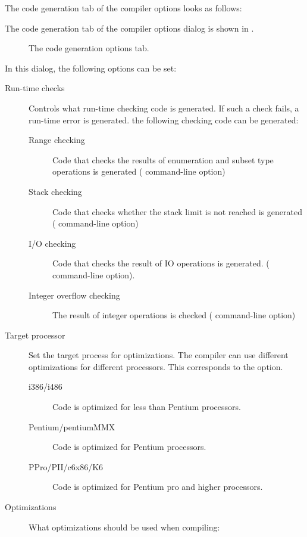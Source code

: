 \begin{htmlonly}
The code generation tab of the compiler options  looks as follows:
\end{htmlonly}
\begin{latexonly}
The code generation tab of the compiler options dialog is shown in
.
\begin{figure}[ht]
\begin{center}
\caption{The code generation options tab.}\label{fig:ocompb}
\ifpdf
{}
\else
{}
\fi
\end{center}
\end{figure}
\end{latexonly}
In this dialog, the following options can be set:
\begin{description}
\item[Run-time checks] Controls what run-time checking code is generated. If
such a check fails, a run-time error is generated.
the following checking code can be generated:
\begin{description}
\item[Range checking] Code that checks the results of enumeration and subset
type operations is generated ( command-line option)
\item[Stack checking] Code that checks whether the stack limit is not
reached is generated ( command-line option)
\item[I/O checking] Code that checks the result of IO operations is
generated. ( command-line option).
\item[Integer overflow checking] The result of integer operations is
checked ( command-line option)
\end{description}
\item[Target processor] Set the target process for optimizations. The
compiler can use different optimizations for different processors. This
corresponds to the  option.
\begin{description}
\item[i386/i486] Code is optimized for less than Pentium processors.
\item[Pentium/pentiumMMX] Code is optimized for Pentium processors.
\item[PPro/PII/c6x86/K6] Code is optimized for Pentium pro and higher
processors.
\end{description}
\item[Optimizations] What optimizations should be used when compiling:

\end{description}
